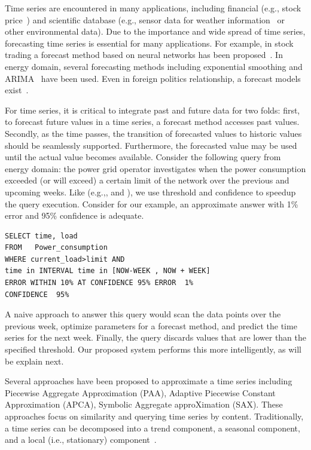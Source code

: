 
Time series are encountered in many applications, including financial (e.g., stock price~\cite{stock}) and scientific database (e.g.,
sensor data for weather information~\cite{arimaEng} or other environmental data).
Due to the importance and wide spread of time series,  forecasting time series is essential for  many applications. For example, in stock trading a forecast method based on  neural networks  has been proposed~\cite{stock}.
In energy domain, several forecasting methods including exponential smoothing \cite{} and ARIMA~\cite{tBOX76a} have been used.
Even in foreign politics relationship, a forecast models exist~\cite{iran}.

For time series, it is  critical to integrate past and future data for two folds: first, to forecast future values in a time series, a forecast method  accesses past values.   Secondly, as the time passes, the transition of forecasted values to historic values should be seamlessly supported. Furthermore, the forecasted value  may be used until the actual value becomes available.   Consider the following query from  energy domain: the power grid operator investigates when the power consumption exceeded (or will exceed) a certain limit of the network  over the previous and upcoming weeks. Like 
 (e.g.,\cite{AG99}, \cite{BlinkDB} and \cite{KML10}), we use threshold and confidence to speedup the query execution. 
Consider for our example, an approximate answer with 1\% error  and 95\% confidence is adequate.
\begin{verbatim}
SELECT time, load
FROM   Power_consumption
WHERE current_load>limit AND
time in INTERVAL time in [NOW-WEEK , NOW + WEEK]      
ERROR WITHIN 10% AT CONFIDENCE 95% ERROR  1%
CONFIDENCE  95%
\end{verbatim}
 A naive approach to answer this query would scan the data points over the previous week, optimize parameters for a forecast method, and predict the time series for the next week. Finally, the query discards values that are lower than the specified threshold. Our proposed system performs this more intelligently, as will be explain next. 


Several approaches have been proposed to approximate a time series including Piecewise Aggregate Approximation (PAA), Adaptive Piecewise Constant Approximation (APCA),  Symbolic Aggregate approXimation (SAX). These approaches focus on similarity and querying time series by content.
Traditionally, a time series  can be decomposed into a trend component, a seasonal component, and a local (i.e., stationary) component~\cite{Decompose}. 

